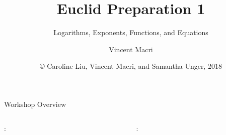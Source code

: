 

\usepackage{cleveref}

\title{Euclid Preparation 1}
\subtitle{Logarithms, Exponents, Functions, and Equations}
\author{Vincent Macri}
\date{\copyright{} Caroline Liu, Vincent Macri, and Samantha Unger, 2018}

\renewcommand\thepart{\Roman{part}}


	\frame{\titlepage}
	\begin{namedframe}{Workshop Overview}
		\begin{columns}[t]
			\begin{column}{0.5\textwidth}
				:
				\newline
				\tableofcontents[part=1]
			\end{column}
			\begin{column}{0.5\textwidth}
				:
				\newline
				\tableofcontents[part=2]
			\end{column}
		\end{columns}
	\end{namedframe}
	
	

